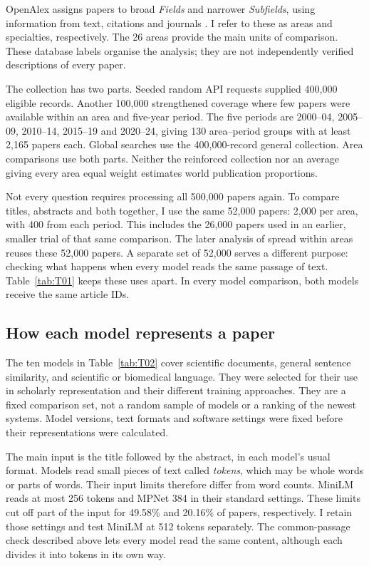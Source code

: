 OpenAlex assigns papers to broad \emph{Fields} and narrower \emph{Subfields}, using information from text, citations and journals \citep{openalex2026topics}. I refer to these as areas and specialties, respectively. The 26 areas provide the main units of comparison. These database labels organise the analysis; they are not independently verified descriptions of every paper.

The collection has two parts. Seeded random API requests supplied 400,000 eligible records. Another 100,000 strengthened coverage where few papers were available within an area and five-year period. The five periods are 2000--04, 2005--09, 2010--14, 2015--19 and 2020--24, giving 130 area--period groups with at least 2,165 papers each. Global searches use the 400,000-record general collection. Area comparisons use both parts. Neither the reinforced collection nor an average giving every area equal weight estimates world publication proportions.

Not every question requires processing all 500,000 papers again. To compare titles, abstracts and both together, I use the same 52,000 papers: 2,000 per area, with 400 from each period. This includes the 26,000 papers used in an earlier, smaller trial of that same comparison. The later analysis of spread within areas reuses these 52,000 papers. A separate set of 52,000 serves a different purpose: checking what happens when every model reads the same passage of text. Table~\ref{tab:T01} keeps these uses apart. In every model comparison, both models receive the same article IDs.


\subsection{How each model represents a paper}
The ten models in Table~\ref{tab:T02} cover scientific documents, general sentence similarity, and scientific or biomedical language. They were selected for their use in scholarly representation and their different training approaches. They are a fixed comparison set, not a random sample of models or a ranking of the newest systems. Model versions, text formats and software settings were fixed before their representations were calculated.

The main input is the title followed by the abstract, in each model's usual format. Models read small pieces of text called \emph{tokens}, which may be whole words or parts of words. Their input limits therefore differ from word counts. MiniLM reads at most 256 tokens and MPNet 384 in their standard settings. These limits cut off part of the input for 49.58\% and 20.16\% of papers, respectively. I retain those settings and test MiniLM at 512 tokens separately. The common-passage check described above lets every model read the same content, although each divides it into tokens in its own way.

